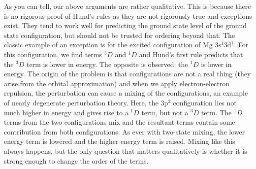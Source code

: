 \documentclass{article}
\theoremstyle{plain}\theoremheaderfont{\normalfont\itshape}\theorembodyfont{\rmfamily}\theoremseparator{.}\newtheorem*{rem}{Remark}\newtheorem*{ex}{Example}\newtheorem*{proof}{Proof}\newtheorem*{altp}{Alternative proof}
\theoremstyle{plain}\theoremheaderfont{\normalfont\bfseries}\theorembodyfont{\rmfamily}\theoremseparator{.}\newtheorem{thm}{Theorem}[section]\newtheorem{lem}[thm]{Lemma}\newtheorem{prop}[thm]{Proposition}\newtheorem*{cor}{Corollary}\newtheorem{defn}[thm]{Definition}\newtheorem{clm}[thm]{Claim}\newtheorem{clminproof}{Claim}
\theoremstyle{break}\theoremheaderfont{\normalfont\itshape}\theorembodyfont{\rmfamily}\theoremseparator{.\medskip}\newtheorem*{proofskip}{Proof}\newtheorem*{exs}{Examples}\newtheorem*{rems}{Remarks}
\theoremstyle{break}\theoremheaderfont{\normalfont\bfseries}\theorembodyfont{\rmfamily}\theoremseparator{.\medskip}\newtheorem{lemskip}[thm]{Lemma}\newtheorem{defnskip}[thm]{Definition}\newtheorem{propskip}[thm]{Proposition}\newtheorem{thmskip}[thm]{Theorem}
\numberwithin{equation}{section}
\begin{document}
    As you can tell, our above arguments are rather qualitative. This is because there is no rigorous proof of Hund's rules as they are not rigorously true and exceptions exist. They tend to work well for predicting the ground state level of the ground state configuration, but should not be trusted for ordering beyond that. The classic example of an exception is for the excited configuration of \(\mathrm{Mg}\) \(\mathrm{3s^1 3d^1}\). For this configuration, we find terms \(^3D\) and \(^1D\) and Hund's first rule predicts that the \(^3D\) term is lower in energy. The opposite is observed: the \(^1D\) is lower in energy. The origin of the problem is that configurations are not a real thing (they arise from the orbital approximation) and when we apply electron-electron repulsion, the perturbation can cause a mixing of the configurations, an example of nearly degenerate perturbation theory. Here, the \(\mathrm{3p^2}\) configuration lies not much higher in energy and gives rise to a \(^1D\) term, but not a \(^3D\) term. The \(^1D\) terms from the two configurations mix and the resultant terms contain some contribution from both configurations. As ever with two-state mixing, the lower energy term is lowered and the higher energy term is raised. Mixing like this always happens, but the only question that matters qualitatively is whether it is strong enough to change the order of the terms.
\end{document}
